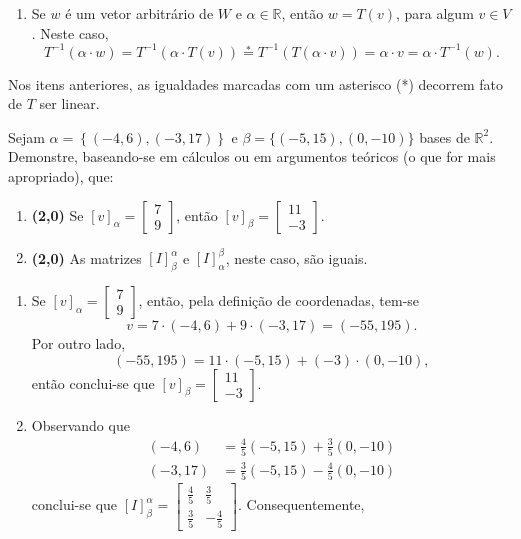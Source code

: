 \documentclass[12pt,a4paper]{article}
\newcommand*\R{\mathbb{R}}
\begin{document}
\begin{ExerciseList}
\begin{enumerate}
\item Se $w$ é um vetor arbitrário de $W$ e $\alpha \in \R$, então $w = T(v)$, para algum $v\in V$. Neste caso,
\[
T^{-1}(\alpha \cdot w)
= T^{-1}(\alpha \cdot T(v))
\stackrel{*}{=} T^{-1}(T(\alpha \cdot v))
= \alpha \cdot v
= \alpha \cdot T^{-1}(w).
\]
\end{enumerate}
Nos itens anteriores, as igualdades marcadas com um asterisco (*) decorrem fato de $T$ ser linear.

\Exercise
Sejam $\alpha = \left\{ (-4,6), (-3,17)\right\}$ e $\beta = \{ (-5,15), (0,-10) \}$ bases de $\R^2$. Demonstre, baseando-se em cálculos ou em argumentos teóricos (o que for mais apropriado), que:
\begin{enumerate}
\item \textbf{(2,0)} Se $[v]_{\alpha} =
\begin{bmatrix}
7\\9
\end{bmatrix}$, então $[v]_{\beta} =
\begin{bmatrix}
11\\-3
\end{bmatrix}$.
\item \textbf{(2,0)} As matrizes $[I]_{\beta}^{\alpha}$ e $[I]_{\alpha}^{\beta}$, neste caso, são iguais.
\end{enumerate}
\Answer
\begin{enumerate}
\item Se $[v]_{\alpha} =
\begin{bmatrix}
7\\9
\end{bmatrix}$, então, pela definição de coordenadas, tem-se
\[
v = 7\cdot (-4,6)+9\cdot (-3,17) = (-55, 195).
\]
Por outro lado,
\[
(-55, 195) = 11\cdot (-5,15) + (-3)\cdot (0,-10),
\]
então conclui-se que $[v]_{\beta} =
\begin{bmatrix}
11\\-3
\end{bmatrix}$.
\item
Observando que
\begin{align*}
(-4, 6)& =\frac{4}{5}(-5,15)+\frac{3}{5}(0,-10)\\
(-3,17)& =\frac{3}{5}(-5,15)-\frac{4}{5}(0,-10)
\end{align*}
conclui-se que $[I]_{\beta}^{\alpha}
=\begin{bmatrix}
\frac{4}{5} & \frac{3}{5} \\
\frac{3}{5} & -\frac{4}{5}
\end{bmatrix}$. Consequentemente,
\[
\]
\end{enumerate}
\end{ExerciseList}
\end{document}
